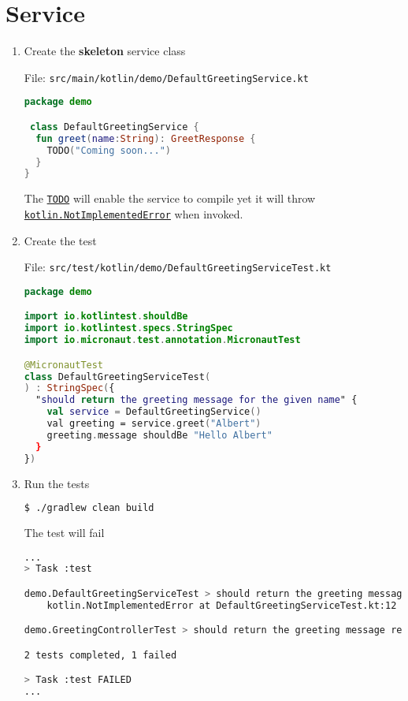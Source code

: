 \section{Service}\label{sec:service}

\begin{enumerate}

\item Create the \textbf{skeleton} service class

File: \texttt{src/main/kotlin/demo/DefaultGreetingService.kt}
\begin{lstlisting}[language=Kotlin]
package demo

 class DefaultGreetingService {
  fun greet(name:String): GreetResponse {
    TODO("Coming soon...")
  }
}
\end{lstlisting}

The \href{https://kotlinlang.org/api/latest/jvm/stdlib/kotlin/-t-o-d-o.html}{\texttt{TODO}} will enable the service to compile yet it will throw \href{https://kotlinlang.org/api/latest/jvm/stdlib/kotlin/-not-implemented-error/}{\texttt{kotlin.NotImplementedError}} when invoked.

\item Create the test

File: \texttt{src/test/kotlin/demo/DefaultGreetingServiceTest.kt}
\begin{lstlisting}[language=Kotlin]
package demo

import io.kotlintest.shouldBe
import io.kotlintest.specs.StringSpec
import io.micronaut.test.annotation.MicronautTest

@MicronautTest
class DefaultGreetingServiceTest(
) : StringSpec({
  "should return the greeting message for the given name" {
    val service = DefaultGreetingService()
    val greeting = service.greet("Albert")
    greeting.message shouldBe "Hello Albert"
  }
})
\end{lstlisting}

\item Run the tests

\begin{lstlisting}[language=bash]
$ ./gradlew clean build
\end{lstlisting}

The test will fail

\begin{lstlisting}[language=bash]
...
> Task :test

demo.DefaultGreetingServiceTest > should return the greeting message for the given name FAILED
    kotlin.NotImplementedError at DefaultGreetingServiceTest.kt:12

demo.GreetingControllerTest > should return the greeting message returned by the greeting service PASSED

2 tests completed, 1 failed

> Task :test FAILED
...
\end{lstlisting}

\end{enumerate}


